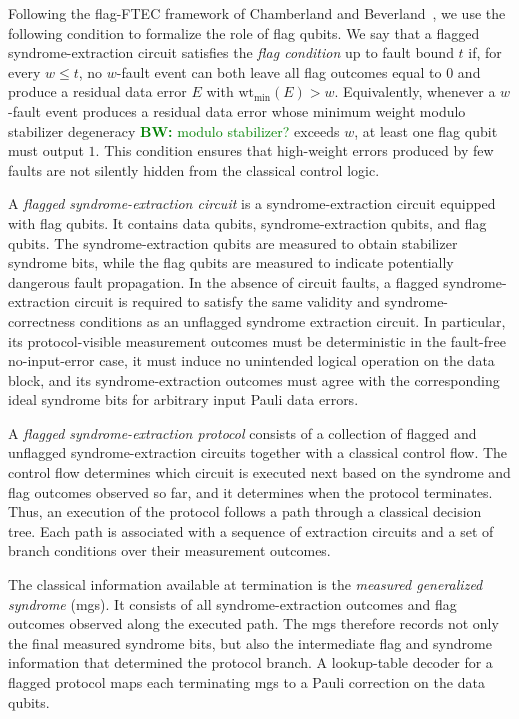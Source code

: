 \documentclass[acmsmall,screen,review,anonymous,nonacm]{acmart}
\newcommand{\showcomment}[1]{#1}
\newcommand{\bw}[1]{\showcomment{\textcolor{green}{\textbf{BW:} #1}}}
\begin{document}
Following the flag-FTEC framework of Chamberland and Beverland~\cite{CB18}, we use the following condition to formalize the role of flag qubits. We say that a flagged syndrome-extraction circuit satisfies the \emph{flag condition} up to fault bound $t$ if, for every $w\le t$, no $w$-fault event can both leave all flag outcomes equal to $0$ and produce a residual data error $E$ with $\mathrm{wt}_{\min}(E)>w$. Equivalently, whenever a $w$-fault event produces a residual data error whose minimum weight modulo stabilizer degeneracy  \bw{modulo stabilizer?} exceeds $w$, at least one flag qubit must output $1$. This condition ensures that high-weight errors produced by few faults are not silently hidden from the classical control logic.

A \emph{flagged syndrome-extraction circuit} is a syndrome-extraction circuit equipped with flag qubits. It contains data qubits, syndrome-extraction qubits, and flag qubits. The syndrome-extraction qubits are measured to obtain stabilizer syndrome bits, while the flag qubits are measured to indicate potentially dangerous fault propagation. In the absence of circuit faults, a flagged syndrome-extraction circuit is required to satisfy the same validity and syndrome-correctness conditions as an unflagged syndrome extraction circuit. In particular, its protocol-visible measurement outcomes must be deterministic in the fault-free no-input-error case, it must induce no unintended logical operation on the data block, and its syndrome-extraction outcomes must agree with the corresponding ideal syndrome bits for arbitrary input Pauli data errors.

A \emph{flagged syndrome-extraction protocol} consists of a collection of flagged and unflagged syndrome-extraction circuits together with a classical control flow. The control flow determines which circuit is executed next based on the syndrome and flag outcomes observed so far, and it determines when the protocol terminates. Thus, an execution of the protocol follows a path through a classical decision tree. Each path is associated with a sequence of extraction circuits and a set of branch conditions over their measurement outcomes.

The classical information available at termination is the \emph{measured generalized syndrome} (mgs). It consists of all syndrome-extraction outcomes and flag outcomes observed along the executed path. The mgs therefore records not only the final measured syndrome bits, but also the intermediate flag and syndrome information that determined the protocol branch. A lookup-table decoder for a flagged protocol maps each terminating mgs to a Pauli correction on the data qubits.
\end{document}
